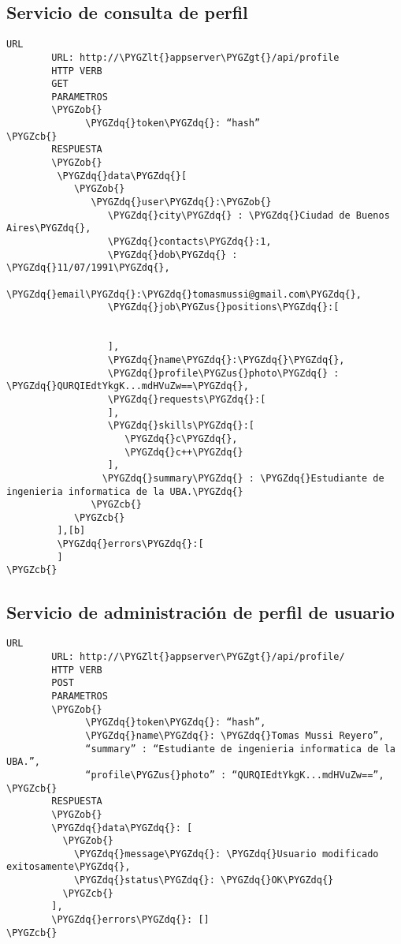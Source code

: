 \documentclass[a4paper,10pt,spanish]{sphinxmanual}
\def\PYGZus{\char`\_}
\def\PYGZob{\char`\{}
\def\PYGZcb{\char`\}}
\def\PYGZlt{\char`\<}
\def\PYGZgt{\char`\>}
\def\PYGZdq{\char`\"}
\begin{document}
\subsection{Servicio de consulta de perfil}
\label{apiRest:servicio-de-consulta-de-perfil}
\begin{Verbatim}[commandchars=\\\{\}]
URL
        URL: http://\PYGZlt{}appserver\PYGZgt{}/api/profile
        HTTP VERB
        GET
        PARAMETROS
        \PYGZob{}
              \PYGZdq{}token\PYGZdq{}: “hash”
\PYGZcb{}
        RESPUESTA
        \PYGZob{}
         \PYGZdq{}data\PYGZdq{}[
            \PYGZob{}
               \PYGZdq{}user\PYGZdq{}:\PYGZob{}
                  \PYGZdq{}city\PYGZdq{} : \PYGZdq{}Ciudad de Buenos Aires\PYGZdq{},
                  \PYGZdq{}contacts\PYGZdq{}:1,
                  \PYGZdq{}dob\PYGZdq{} : \PYGZdq{}11/07/1991\PYGZdq{},
                  \PYGZdq{}email\PYGZdq{}:\PYGZdq{}tomasmussi@gmail.com\PYGZdq{},
                  \PYGZdq{}job\PYGZus{}positions\PYGZdq{}:[


                  ],
                  \PYGZdq{}name\PYGZdq{}:\PYGZdq{}\PYGZdq{},
                  \PYGZdq{}profile\PYGZus{}photo\PYGZdq{} : \PYGZdq{}QURQIEdtYkgK...mdHVuZw==\PYGZdq{},
                  \PYGZdq{}requests\PYGZdq{}:[
                  ],
                  \PYGZdq{}skills\PYGZdq{}:[
                     \PYGZdq{}c\PYGZdq{},
                     \PYGZdq{}c++\PYGZdq{}
                  ],
                 \PYGZdq{}summary\PYGZdq{} : \PYGZdq{}Estudiante de ingenieria informatica de la UBA.\PYGZdq{}
               \PYGZcb{}
            \PYGZcb{}
         ],[b]
         \PYGZdq{}errors\PYGZdq{}:[
         ]
\PYGZcb{}
\end{Verbatim}


\subsection{Servicio de administración de perfil de usuario}
\label{apiRest:servicio-de-administracion-de-perfil-de-usuario}
\begin{Verbatim}[commandchars=\\\{\}]
URL
        URL: http://\PYGZlt{}appserver\PYGZgt{}/api/profile/
        HTTP VERB
        POST
        PARAMETROS
        \PYGZob{}
              \PYGZdq{}token\PYGZdq{}: “hash”,
              \PYGZdq{}name\PYGZdq{}: \PYGZdq{}Tomas Mussi Reyero”,
              “summary” : “Estudiante de ingenieria informatica de la UBA.”,
              “profile\PYGZus{}photo” : “QURQIEdtYkgK...mdHVuZw==”,
\PYGZcb{}
        RESPUESTA
        \PYGZob{}
        \PYGZdq{}data\PYGZdq{}: [
          \PYGZob{}
            \PYGZdq{}message\PYGZdq{}: \PYGZdq{}Usuario modificado exitosamente\PYGZdq{},
            \PYGZdq{}status\PYGZdq{}: \PYGZdq{}OK\PYGZdq{}
          \PYGZcb{}
        ],
        \PYGZdq{}errors\PYGZdq{}: []
\PYGZcb{}
\end{Verbatim}
\end{document}
